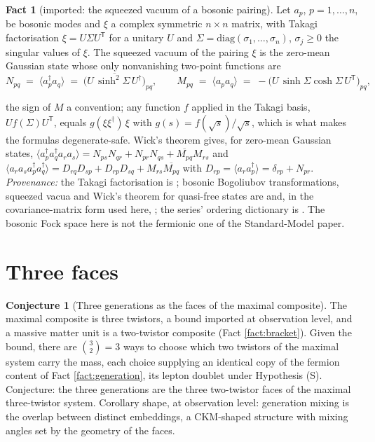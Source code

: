 \documentclass[11pt]{article}
\theoremstyle{definition}
\newtheorem{conjecture}[theorem]{Conjecture}
\newtheorem{fact}[theorem]{Fact}
\begin{document}
\begin{fact}[imported: the squeezed vacuum of a bosonic pairing]\label{fact:gaussian}
Let $a_{p}$, $p = 1, \dots, n$, be bosonic modes and $\xi$ a complex symmetric $n \times n$ matrix, with Takagi factorisation $\xi = U\Sigma U^{\mathsf{T}}$ for a unitary $U$ and $\Sigma = \mathrm{diag}(\sigma_{1}, \dots, \sigma_{n})$, $\sigma_{j} \ge 0$ the singular values of $\xi$. The squeezed vacuum of the pairing $\xi$ is the zero-mean Gaussian state whose only nonvanishing two-point functions are
\[
N_{pq} \;=\; \langle a_{p}^{\dagger}a_{q}\rangle \;=\; \overline{\bigl(U\,\sinh^{2}\!\Sigma\,U^{\dagger}\bigr)}_{pq}, \qquad
M_{pq} \;=\; \langle a_{p}a_{q}\rangle \;=\; -\bigl(U\,\sinh\Sigma\cosh\Sigma\,U^{\mathsf{T}}\bigr)_{pq},
\]

the sign of $M$ a convention; any function $f$ applied in the Takagi basis, $U f(\Sigma) U^{\mathsf{T}}$, equals $g(\xi\xi^{\dagger})\,\xi$ with $g(s) = f(\sqrt{s})/\sqrt{s}$, which is what makes the formulas degenerate-safe. Wick's theorem gives, for zero-mean Gaussian states, $\langle a_{p}^{\dagger}a_{q}^{\dagger}a_{r}a_{s}\rangle = N_{ps}N_{qr} + N_{pr}N_{qs} + \overline{M_{pq}}M_{rs}$ and $\langle a_{r}a_{s}a_{p}^{\dagger}a_{q}^{\dagger}\rangle = D_{rq}D_{sp} + D_{rp}D_{sq} + M_{rs}\overline{M_{pq}}$ with $D_{rp} = \langle a_{r}a_{p}^{\dagger}\rangle = \delta_{rp} + N_{pr}$. \emph{Provenance:} the Takagi factorisation is \cite[Cor.~4.4.4]{HornJohnson}; bosonic Bogoliubov transformations, squeezed vacua and Wick's theorem for quasi-free states are \cite[Ch.~2-3]{Berezin1966} and, in the covariance-matrix form used here, \cite[\S II]{Weedbrook2012}; the series' ordering dictionary is \cite[Thm.~5.7]{ButlerT9}. The bosonic Fock space here is not the fermionic one of the Standard-Model paper.
\end{fact}

\section{Three faces}\label{sec:faces}

\begin{conjecture}[Three generations as the faces of the maximal composite]\label{conj:faces}
The maximal composite is three twistors, a bound imported at observation level, and a massive matter unit is a two-twistor composite (Fact \ref{fact:bracket}). Given the bound, there are $\binom{3}{2} = 3$ ways to choose which two twistors of the maximal system carry the mass, each choice supplying an identical copy of the fermion content of Fact \ref{fact:generation}, its lepton doublet under Hypothesis (S). Conjecture: the three generations are the three two-twistor faces of the maximal three-twistor system. Corollary shape, at observation level: generation mixing is the overlap between distinct embeddings, a CKM-shaped structure with mixing angles set by the geometry of the faces.
\end{conjecture}
\end{document}
